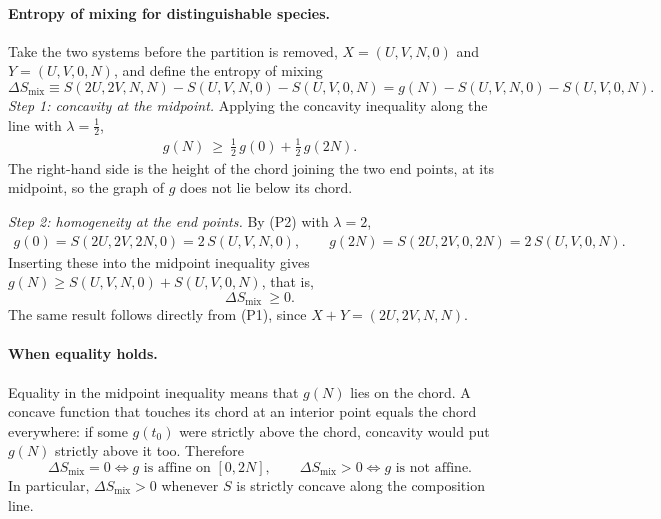 \paragraph{Entropy of mixing for distinguishable species.}
Take the two systems before the partition is removed,
$X=(U,V,N,0)$ and $Y=(U,V,0,N)$, and define the entropy of mixing
\begin{equation}
    \boxed{\Delta S_{\mathrm{mix}}\equiv S(2U,2V,N,N)-S(U,V,N,0)-S(U,V,0,N)
    =g(N)-S(U,V,N,0)-S(U,V,0,N).}
\end{equation}
\emph{Step 1: concavity at the midpoint.} Applying the concavity inequality
along the line with $\lambda=\tfrac12$,
\begin{align*}
    g(N)\ \ge\ \tfrac12\,g(0)+\tfrac12\,g(2N).
\end{align*}
The right-hand side is the height of the chord joining the two end points,
at its midpoint, so the graph of $g$ does not lie below its chord.

\emph{Step 2: homogeneity at the end points.} By (P2) with $\lambda=2$,
\begin{align*}
    g(0)=S(2U,2V,2N,0)=2\,S(U,V,N,0),\qquad
    g(2N)=S(2U,2V,0,2N)=2\,S(U,V,0,N).
\end{align*}
Inserting these into the midpoint inequality gives
$g(N)\ge S(U,V,N,0)+S(U,V,0,N)$, that is,
\begin{equation}
    \boxed{\Delta S_{\mathrm{mix}}\ \ge 0.}
\end{equation}
The same result follows directly from (P1), since $X+Y=(2U,2V,N,N)$.

\paragraph{When equality holds.}
Equality in the midpoint inequality means that $g(N)$ lies on the chord. A
concave function that touches its chord at an interior point equals the chord
everywhere: if some $g(t_0)$ were strictly above the chord, concavity would
put $g(N)$ strictly above it too. Therefore
\begin{equation}
    \boxed{\Delta S_{\mathrm{mix}}=0
    \iff g \text{ is affine on } [0,2N],
    \qquad
    \Delta S_{\mathrm{mix}}>0
    \iff g \text{ is not affine.}}
\end{equation}
In particular, $\Delta S_{\mathrm{mix}}>0$ whenever $S$ is strictly concave
along the composition line.

